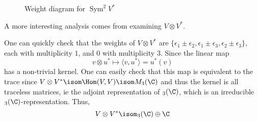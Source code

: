 \documentclass[11pt,leqno,oneside]{amsart}
\numberwithin{thm}{section}
\begin{document}
\begin{example}
\begin{figure}[h]
    \caption{Weight diagram for \(\operatorname{Sym}^2 V^*\)}
  \end{figure}
  A more interesting analysis comes from examining \(V
  \otimes V^*\).

  One can quickly check that the weights of \(V \otimes V^*\) are
  \(\{\epsilon_1 \pm \epsilon_2, \epsilon_1 \pm \epsilon_3, \epsilon_2
  \pm \epsilon_3\}\), each with multiplicity \(1\), and \(0\) with
  multiplicity \(3\). Since the linear map \[
    v \otimes u^* \mapsto \langle v, u^* \rangle = u^*(v)
  \]
  has a non-trivial kernel. One can easily check that this map is
  equivalent to the trace since \(V \otimes V^* \isom \Hom(V,V) \isom
  M_3(\C)\) and thus the kernel is all traceless matrices, ie
  the adjoint representation of \(\sl_3(\C)\), which is an irreducible
  \(\sl_3(\C)\)-representation. Thus, \[
    V \otimes V^* \isom \sl_3(\C) \oplus \C
  \]
\end{example}
\end{document}
